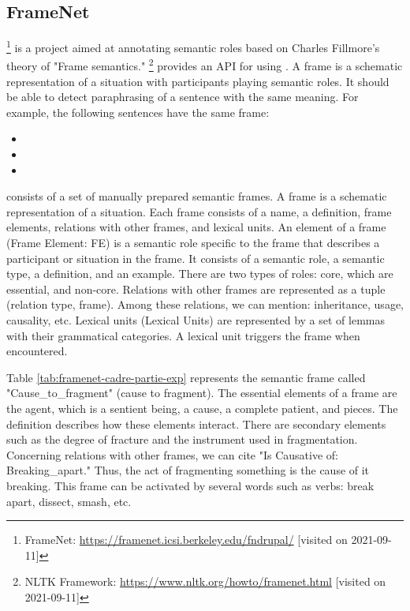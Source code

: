 \documentclass{KBook}
\begin{document}
\subsection{FrameNet}

\footnote{FrameNet: \url{https://framenet.icsi.berkeley.edu/fndrupal/} [visited on 2021-09-11]} is a project aimed at annotating semantic roles based on Charles Fillmore's theory of "Frame semantics." \footnote{NLTK Framework: \url{https://www.nltk.org/howto/framenet.html} [visited on 2021-09-11]} provides an API for using . A frame is a schematic representation of a situation with participants playing semantic roles. It should be able to detect paraphrasing of a sentence with the same meaning. For example, the following sentences have the same frame:

\begin{itemize}
	\item {}
	\item {}
	\item {}
\end{itemize}

 consists of a set of manually prepared semantic frames. A frame is a schematic representation of a situation. Each frame consists of a name, a definition, frame elements, relations with other frames, and lexical units. An element of a frame (Frame Element: FE) is a semantic role specific to the frame that describes a participant or situation in the frame. It consists of a semantic role, a semantic type, a definition, and an example. There are two types of roles: core, which are essential, and non-core. Relations with other frames are represented as a tuple (relation type, frame). Among these relations, we can mention: inheritance, usage, causality, etc. Lexical units (Lexical Units) are represented by a set of lemmas with their grammatical categories. A lexical unit triggers the frame when encountered.

Table \ref{tab:framenet-cadre-partie-exp} represents the semantic frame called "Cause\_to\_fragment" (cause to fragment). The essential elements of a frame are the agent, which is a sentient being, a cause, a complete patient, and pieces. The definition describes how these elements interact. There are secondary elements such as the degree of fracture and the instrument used in fragmentation. Concerning relations with other frames, we can cite "Is Causative of: Breaking\_apart." Thus, the act of fragmenting something is the cause of it breaking. This frame can be activated by several words such as verbs: break apart, dissect, smash, etc.
\end{document}
